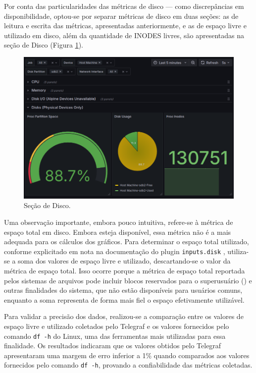 Por conta das particularidades das métricas de disco --- como discrepâncias em disponibilidade, optou-se por separar métricas de disco em duas seções: as de leitura e escrita das métricas, apresentadas anteriormente, e as de espaço livre e utilizado em disco, além da quantidade de INODES livres, são apresentadas na seção de Disco (Figura \ref{fig:dashboard-disk}). 

\begin{figure}[H]
\centering
\setlength{\abovecaptionskip}{-20pt}
\includegraphics[width=\textwidth]{Imagens/chap04/dashboard/disk.png}
\caption{Seção de Disco.}
\label{fig:dashboard-disk}
\end{figure}

Uma observação importante, embora pouco intuitiva, refere-se à métrica de espaço total em disco. Embora esteja disponível, essa métrica não é a mais adequada para os cálculos dos gráficos. Para determinar o espaço total utilizado, conforme explicitado em nota na documentação do plugin \verb|inputs.disk| \citep{inputsdisk2025}, utiliza-se a soma dos valores de espaço livre e utilizado, descartando-se o valor da métrica de espaço total. Isso ocorre porque a métrica de espaço total reportada pelos sistemas de arquivos pode incluir blocos reservados para o superusuário () e outras finalidades do sistema, que não estão disponíveis para usuários comuns, enquanto a soma  representa de forma mais fiel o espaço efetivamente utilizável.

Para validar a precisão dos dados, realizou-se a comparação entre os valores de espaço livre e utilizado coletados pelo Telegraf e os valores fornecidos pelo comando \verb|df -h| do Linux, uma das ferramentas mais utilizadas para essa finalidade. Os resultados indicaram que os valores obtidos pelo Telegraf apresentaram uma margem de erro inferior a 1\% quando comparados aos valores fornecidos pelo comando \verb|df -h|, provando a confiabilidade das métricas coletadas.

